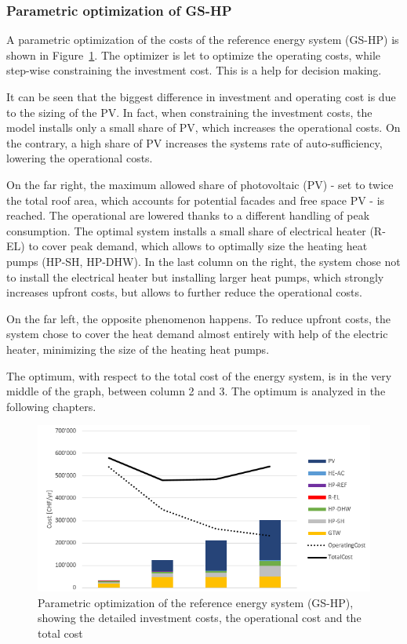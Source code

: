 \documentclass{article}
\begin{document}
\subsubsection{Parametric optimization of GS-HP}
A parametric optimization of the costs of the reference energy system (GS-HP) is shown in Figure~\ref{fig:V_G_PO}. The optimizer is let to optimize the operating costs, while step-wise constraining the investment cost. This is a help for decision making.

It can be seen that the biggest difference in investment and operating cost is due to the sizing of the PV. In fact, when constraining the investment costs, the model installs only a small share of PV, which increases the operational costs. On the contrary, a high share of PV increases the systems rate of auto-sufficiency, lowering the operational costs. 

On the far right, the maximum allowed share of photovoltaic (PV) - set to twice the total roof area, which accounts for potential facades and free space PV - is reached. The operational are lowered thanks to a different handling of peak consumption. The optimal system installs a small share of electrical heater (R-EL) to cover peak demand, which allows to optimally size the heating heat pumps (HP-SH, HP-DHW). In the last column on the right, the system chose not to install the electrical heater but installing larger heat pumps, which strongly increases upfront costs, but allows to further reduce the operational costs.

On the far left, the opposite phenomenon happens. To reduce upfront costs, the system chose to cover the heat demand almost entirely with help of the electric heater, minimizing the size of the heating heat pumps.

The optimum, with respect to the total cost of the energy system, is in the very middle of the graph, between column 2 and 3. The optimum is analyzed in the following chapters.

\begin{figure}[htp]
	\centering
	\includegraphics[width=1\textwidth]{V_G_PO1.png}
	\caption{Parametric optimization of the reference energy system (GS-HP), showing the detailed investment costs, the operational cost and the total cost}
	\label{fig:V_G_PO}
\end{figure}
\end{document}
